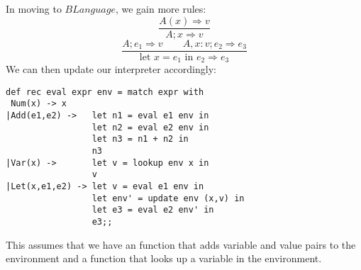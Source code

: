 \documentclass[main.tex]{subfiles}
\begin{document}
In moving to $BLanguage$, we gain more rules:
$$\frac{A(x) \Rightarrow v}{A;x \Rightarrow v}$$
$$
\frac{A;e_1 \Rightarrow v \qquad A,x:v;e_2 \Rightarrow e_3}{\text{let } x = e_1 \text { in } e_2 \Rightarrow e_3}
$$
We can then update our interpreter accordingly:
\begin{lstlisting}[style=Myocamlstyle]
def rec eval expr env = match expr with
 Num(x) -> x 
|Add(e1,e2) ->   let n1 = eval e1 env in 
                 let n2 = eval e2 env in 
                 let n3 = n1 + n2 in 
                 n3
|Var(x) ->       let v = lookup env x in 
                 v
|Let(x,e1,e2) -> let v = eval e1 env in
                 let env' = update env (x,v) in
                 let e3 = eval e2 env' in 
                 e3;;
\end{lstlisting}
This assumes that we have an function that adds variable and value pairs to the environment and a function that looks up a variable in the environment.
\end{document}
